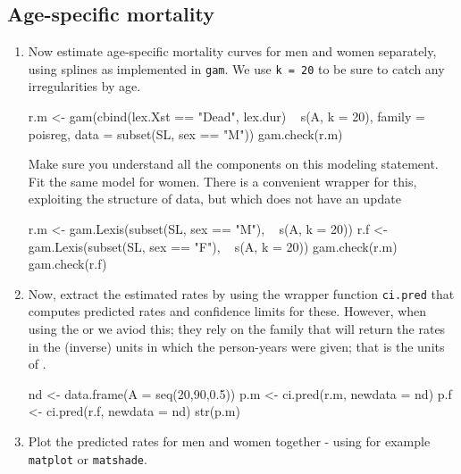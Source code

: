\subsection*{Age-specific mortality}
\begin{enumerate}[resume]
\item Now estimate age-specific mortality curves for men and
  women separately, using splines as implemented in \texttt{gam}.
  We use \texttt{k = 20} to be sure to catch any irregularities by age.
\begin{Schunk}
\begin{Sinput}
 r.m <- gam(cbind(lex.Xst == "Dead", lex.dur) ~ s(A, k = 20),
             family = poisreg,
             data = subset(SL, sex == "M"))
 gam.check(r.m)
\end{Sinput}
\end{Schunk}
Make sure you understand all the components on this modeling statement.
Fit the same model for women.
There is a convenient wrapper for this, exploiting the 
structure of data, but which does not have an update
\begin{Schunk}
\begin{Sinput}
 r.m <- gam.Lexis(subset(SL, sex == "M"), ~ s(A, k = 20))
 r.f <- gam.Lexis(subset(SL, sex == "F"), ~ s(A, k = 20))
 gam.check(r.m)
 gam.check(r.f)
\end{Sinput}
\end{Schunk}
\item Now, extract the estimated rates by using the wrapper function
  \texttt{ci.pred} that computes predicted rates and confidence
  limits for these.
  However, when using the  or  we
  aviod this; they rely on the  family that will return
  the rates in the (inverse) units in which the person-years were
  given; that is the units of .
\begin{Schunk}
\begin{Sinput}
 nd <-  data.frame(A = seq(20,90,0.5))
 p.m <- ci.pred(r.m, newdata = nd)
 p.f <- ci.pred(r.f, newdata = nd)
 str(p.m)
\end{Sinput}
\end{Schunk}
\item Plot the predicted rates for men and women together - using for
  example \texttt{matplot} or \texttt{matshade}.
\begin{Schunk}
\end{Schunk}
\end{enumerate}
